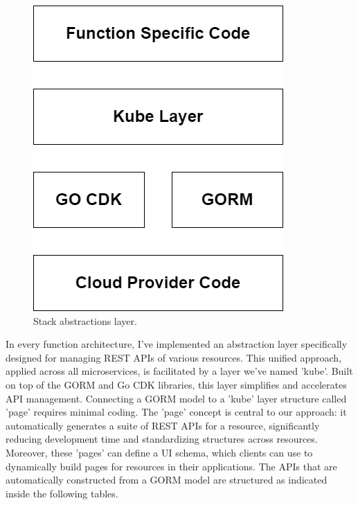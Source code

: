 \begin{figure}
    \centering
    \includegraphics[scale=0.3]{Pictures/5_stack_framework2.png}
    \caption{Stack abstractions layer.}
    \label{fig:5_stack_framework}
\end{figure}

In every function architecture, I've implemented an abstraction layer specifically designed for
managing REST APIs of various resources. This unified approach, applied across all microservices, is
facilitated by a layer we've named 'kube'. Built on top of the GORM and Go CDK libraries, this
layer simplifies and accelerates API management. Connecting a GORM model to a 'kube' layer
structure called 'page' requires minimal coding. The 'page' concept is central to our approach: it
automatically generates a suite of REST APIs for a resource, significantly reducing development time
and standardizing structures across resources. Moreover, these 'pages' can define a UI schema, which
clients can use to dynamically build pages for resources in their applications. The APIs that are
automatically constructed from a GORM model are structured as indicated inside the following tables.

